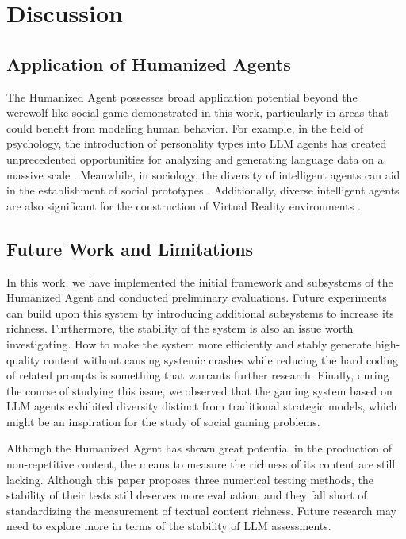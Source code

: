 
\section{Discussion}

\subsection{Application of Humanized Agents}

The Humanized Agent possesses broad application potential beyond the werewolf-like social game demonstrated in this work, particularly in areas that could benefit from modeling human behavior. For example, in the field of psychology, the introduction of personality types into LLM agents has created unprecedented opportunities for analyzing and generating language data on a massive scale \citep{demszky2023using}. Meanwhile, in sociology, the diversity of intelligent agents can aid in the establishment of social prototypes \citep{park2022social}. Additionally, diverse intelligent agents are also significant for the construction of Virtual Reality environments \citep{wan2024building}.


\subsection{Future Work and Limitations}

In this work, we have implemented the initial framework and subsystems of the Humanized Agent and conducted preliminary evaluations. Future experiments can build upon this system by introducing additional subsystems to increase its richness. Furthermore, the stability of the system is also an issue worth investigating. How to make the system more efficiently and stably generate high-quality content without causing systemic crashes while reducing the hard coding of related prompts is something that warrants further research. Finally, during the course of studying this issue, we observed that the gaming system based on LLM agents exhibited diversity distinct from traditional strategic models, which might be an inspiration for the study of social gaming problems.

Although the Humanized Agent has shown great potential in the production of non-repetitive content, the means to measure the richness of its content are still lacking. Although this paper proposes three numerical testing methods, the stability of their tests still deserves more evaluation, and they fall short of standardizing the measurement of textual content richness. Future research may need to explore more in terms of the stability of LLM assessments.

